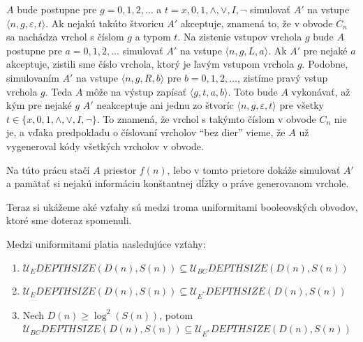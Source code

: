 {\begin{dokaz}
\begin{description}
    $A$ bude postupne pre $g=0,1,2,\dots$ a $t=x,0,1,\wedge,\vee,I,\neg$
    simulovať $A'$ na vstupe $\langle n,g,\varepsilon,t\rangle$. Ak
    nejakú takúto štvoricu $A'$ akceptuje, znamená to, že v obvode
    $C_n$ sa nachádza vrchol s číslom $g$ a typom $t$. Na zistenie
    vstupov vrchola $g$ bude $A$ postupne pre $a=0,1,2,\dots$ simulovať
    $A'$ na vstupe $\langle n,g,L,a\rangle$. Ak $A'$ pre nejaké $a$
    akceptuje, zistili sme číslo vrchola, ktorý je ľavým vstupom
    vrchola $g$. Podobne, simulovaním $A'$ na vstupe $\langle
    n,g,R,b\rangle$ pre $b=0,1,2,\dots$, zistíme pravý vstup vrchola
    $g$. Teda $A$ môže na výstup zapísať $\langle g,t,a,b\rangle$.
    Toto bude $A$ vykonávať, až kým pre nejaké $g$ $A'$ neakceptuje
    ani jednu zo štvoríc $\langle n,g,\varepsilon,t\rangle$ pre
    všetky $t\in\{ x,0,1,\wedge,\vee,I,\neg\} $. To znamená, že vrchol s takýmto
    číslom v obvode $C_n$ nie je, a vďaka predpokladu o číslovaní
    vrcholov ``bez dier'' vieme, že $A$ už vygeneroval kódy všetkých
    vrcholov v obvode.

    Na túto prácu stačí $A$ priestor $f(n)$, lebo v tomto prietore
    dokáže simulovať $A'$ a pamätať si nejakú informáciu konštantnej
    dĺžky o práve generovanom vrchole.
  \end{description}
\end{dokaz}

Teraz si ukážeme aké vzťahy sú medzi troma uniformitami
booleovských obvodov, ktoré sme doteraz spomenuli.

\begin{veta}
  Medzi uniformitami platia nasledujúce vzťahy:
  \begin{enumerate}
    \item $\mathcal{U}_E DEPTHSIZE(D(n),S(n))\subseteq\mathcal{U}_{BC}
    DEPTHSIZE(D(n),S(n))$
    \item $\mathcal{U}_E DEPTHSIZE(D(n),S(n))\subseteq\mathcal{U}_{E^*}
    DEPTHSIZE(D(n),S(n))$
    \item Nech $D(n)\geq\log^2 (S(n))$, potom\newline
    $\mathcal{U}_{BC} DEPTHSIZE(D(n),S(n))\subseteq\mathcal{U}_{E^*}
    DEPTHSIZE(D(n),S(n))$
  \end{enumerate}
\end{veta}

}
